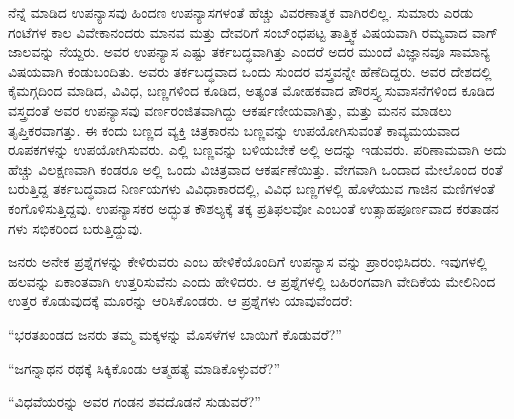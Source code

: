 ನೆನ್ನೆ ಮಾಡಿದ ಉಪನ್ಯಾಸವು ಹಿಂದಣ ಉಪನ್ಯಾಸಗಳಂತೆ ಹೆಚ್ಚು ವಿವರಣಾತ್ಮಕ ವಾಗಿರಲಿಲ್ಲ. ಸುಮಾರು ಎರಡು ಗಂಟೆಗಳ ಕಾಲ ವಿವೇಕಾನಂದರು ಮಾನವ ಮತ್ತು ದೇವರಿಗೆ ಸಂಬ್ಂಧಪಟ್ಟ ತಾತ್ತ್ವಿಕ ವಿಷಯವಾಗಿ ರಮ್ಯವಾದ ವಾಗ್​ಜಾಲವನ್ನು ನೆಯ್ದರು. ಅವರ ಉಪನ್ಯಾಸ ಎಷ್ಟು ತರ್ಕಬದ್ಧವಾಗಿತ್ತು ಎಂದರೆ ಅದರ ಮುಂದೆ ವಿಜ್ಞಾನವೂ ಸಾಮಾನ್ಯ ವಿಷಯವಾಗಿ ಕಂಡುಬಂದಿತು. ಅವರು ತರ್ಕಬದ್ಧವಾದ ಒಂದು ಸುಂದರ ವಸ್ತ್ರವನ್ನೇ ಹೆಣೆದಿದ್ದರು. ಅವರ ದೇಶದಲ್ಲಿ ಕೈಮಗ್ಗದಿಂದ ಮಾಡಿದ, ವಿವಿಧ, ಬಣ್ಣಗಳಿಂದ ಕೂಡಿದ, ಅತ್ಯಂತ ಮೋಹಕವಾದ ಪೌರಸ್ತ್ಯ ಸುವಾಸನೆಗಳಿಂದ ಕೂಡಿದ ವಸ್ತ್ರದಂತೆ ಅವರ ಉಪನ್ಯಾಸವು ವರ್ಣರಂಜಿತವಾಗಿದ್ದು ಆಕರ್ಷಣೀಯವಾಗಿತ್ತು, ಮತ್ತು ಮನನ ಮಾಡಲು ತೃಪ್ತಿಕರವಾಗತ್ತು. ಈ ಕಂದು ಬಣ್ಣದ ವ್ಯಕ್ತಿ ಚಿತ್ರಕಾರನು ಬಣ್ಣವನ್ನು ಉಪಯೋಗಿಸುವಂತೆ ಕಾವ್ಯಮಯವಾದ ರೂಪಕಗಳನ್ನು ಉಪಯೋಗಿಸುವರು. ಎಲ್ಲಿ ಬಣ್ಣವನ್ನು ಬಳಿಯಬೇಕೆ ಅಲ್ಲಿ ಅದನ್ನು ಇಡುವರು. ಪರಿಣಾಮವಾಗಿ ಅದು ಹೆಚ್ಚು ವಿಲಕ್ಷಣವಾಗಿ ಕಂಡರೂ ಅಲ್ಲಿ ಒಂದು ವಿಚಿತ್ರವಾದ ಆಕರ್ಷಣೆಯಿತ್ತು. ವೇಗವಾಗಿ ಒಂದಾದ ಮೇಲೊಂದ ರಂತೆ ಬರುತ್ತಿದ್ದ ತರ್ಕಬದ್ಧವಾದ ನಿರ್ಣಯಗಳು ವಿವಿಧಾಕಾರದಲ್ಲಿ, ವಿವಿಧ ಬಣ್ಣಗಳಲ್ಲಿ ಹೊಳೆಯುವ ಗಾಜಿನ ಮಣಿಗಳಂತೆ ಕಂಗೊಳಿಸುತ್ತಿದ್ದವು. ಉಪನ್ಯಾಸಕರ ಅದ್ಭುತ ಕೌಶಲ್ಯಕ್ಕೆ ತಕ್ಕ ಪ್ರತಿಫಲವೋ ಎಂಬಂತೆ ಉತ್ಸಾಹಪೂರ್ಣವಾದ ಕರತಾಡನ ಗಳು ಸಭಿಕರಿಂದ ಬರುತ್ತಿದ್ದುವು.

ಜನರು ಅನೇಕ ಪ್ರಶ್ನೆಗಳನ್ನು ಕೇಳಿರುವರು ಎಂಬ ಹೇಳಿಕೆಯೊಂದಿಗೆ ಉಪನ್ಯಾಸ ವನ್ನು ಪ್ರಾರಂಭಿಸಿದರು. ಇವುಗಳಲ್ಲಿ ಹಲವನ್ನು ಏಕಾಂತವಾಗಿ ಉತ್ತರಿಸುವೆನು ಎಂದು ಹೇಳಿದರು. ಆ ಪ್ರಶ್ನೆಗಳಲ್ಲಿ ಬಹಿರಂಗವಾಗಿ ವೇದಿಕೆಯ ಮೇಲಿನಿಂದ ಉತ್ತರ ಕೊಡುವುದಕ್ಕೆ ಮೂರನ್ನು ಆರಿಸಿಕೊಂಡರು. ಆ ಪ್ರಶ್ನೆಗಳು ಯಾವುವೆಂದರೆ:

\begin{myquote}
“ಭರತಖಂಡದ ಜನರು ತಮ್ಮ ಮಕ್ಕಳನ್ನು ಮೊಸಳೆಗಳ ಬಾಯಿಗೆ ಕೊಡುವರೆ?”
\end{myquote}

\begin{myquote}
“ಜಗನ್ನಾಥನ ರಥಕ್ಕೆ ಸಿಕ್ಕಿಕೊಂಡು ಆತ್ಮಹತ್ಯೆ ಮಾಡಿಕೊಳ್ಳುವರೆ?”
\end{myquote}

\begin{myquote}
“ವಿಧವೆಯರನ್ನು ಅವರ ಗಂಡನ ಶವದೊಡನೆ ಸುಡುವರೆ?”
\end{myquote}

